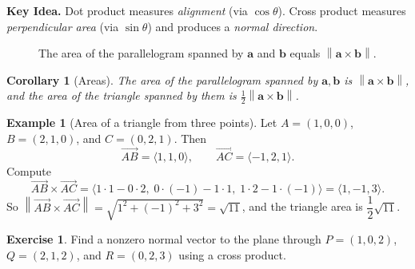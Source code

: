 \documentclass[12pt]{article}
\numberwithin{equation}{section}
\newcommand{\vect}[1]{\boldsymbol{#1}}   %
\newcommand{\norm}[1]{\left\lVert #1\right\rVert}
\theoremstyle{plain}
\newtheorem{corollary}[theorem]{Corollary}
\theoremstyle{definition}
\newtheorem{example}[theorem]{Example}
\newtheorem{exercise}[theorem]{Exercise}
\theoremstyle{remark}
\newenvironment{keyidea}{\begin{tcolorbox}\textbf{Key Idea.}}{\end{tcolorbox}}
\begin{document}
\begin{keyidea}
Dot product measures \emph{alignment} (via $\cos\theta$). Cross product measures \emph{perpendicular area} (via $\sin\theta$) and produces a \emph{normal direction}.
\end{keyidea}

\begin{figure}[H]
\centering
{}
\caption{The area of the parallelogram spanned by $\vect{a}$ and $\vect{b}$ equals $\norm{\vect{a}\times\vect{b}}$.}
\label{fig:cross-area}
\end{figure}

\begin{corollary}[Areas]
The area of the parallelogram spanned by $\vect{a},\vect{b}$ is $\norm{\vect{a}\times\vect{b}}$, and the area of the triangle spanned by them is $\tfrac12\norm{\vect{a}\times\vect{b}}$.
\end{corollary}

\begin{example}[Area of a triangle from three points]
Let $A=(1,0,0)$, $B=(2,1,0)$, and $C=(0,2,1)$. Then
\[
\overrightarrow{AB}=\langle 1,1,0\rangle,\qquad
\overrightarrow{AC}=\langle -1,2,1\rangle.
\]
Compute
\[
\overrightarrow{AB}\times\overrightarrow{AC}
=
\langle 1\cdot 1-0\cdot 2,\; 0\cdot(-1)-1\cdot 1,\; 1\cdot 2-1\cdot(-1)\rangle
=
\langle 1,-1,3\rangle.
\]
So $\norm{\overrightarrow{AB}\times\overrightarrow{AC}}=\sqrt{1^2+(-1)^2+3^2}=\sqrt{11}$, and the triangle area is $\dfrac12\sqrt{11}$.
\end{example}

\begin{exercise}
Find a nonzero normal vector to the plane through $P=(1,0,2)$, $Q=(2,1,2)$, and $R=(0,2,3)$ using a cross product.
\end{exercise}
\end{document}
